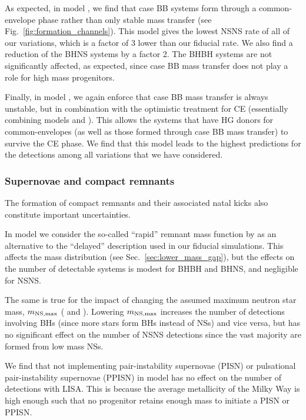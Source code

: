As expected, in model \modCaseBB{}, we find that case BB systems form through a common-envelope phase rather than only stable mass transfer (see Fig.~\ref{fig:formation_channels}). This model gives the lowest NSNS rate of all of our variations, which is a factor of 3 lower than our fiducial rate. We also find a reduction of the BHNS systems by a factor 2. The BHBH systems are not significantly affected, as expected, since case BB mass transfer does not play a role for high mass progenitors.

Finally, in model \modCaseBBOpt{}, we again enforce that case BB mass transfer is always unstable, but in combination with the optimistic treatment for CE (essentially combining models \modCaseBB{} and \modOpt{}). This allows the systems that have HG donors for common-envelopes (as well as those formed through case BB mass transfer) to survive the CE phase. We find that this model leads to the highest predictions for the detections among all variations that we have considered.

\subsubsection{Supernovae and compact remnants}

The formation of compact remnants and their associated natal kicks also constitute important uncertainties.  

In model \modRapid{} we consider the so-called ``rapid'' remnant mass function by \citet{Fryer+2015} as an alternative to the ``delayed'' description used in our fiducial simulations. This affects the mass distribution (see Sec.~\ref{sec:lower_mass_gap}), but the effects on the number of detectable systems is modest for BHBH and BHNS, and negligible for NSNS.  

The same is true for the impact of changing the assumed maximum neutron star mass, $m_{\rm NS, max}$ (\modNSLow{} and \modNSHigh{}). Lowering $m_{\rm NS, max}$ increases the number of detections involving BHs (since more stars form BHs instead of NSs) and vice versa, but has no significant effect on the number of NSNS detections since the vast majority are formed from low mass NSs.

We find that not implementing pair-instability supernovae (PISN) or pulsational pair-instability supernovae (PPISN) in model \modNoPISN{} has no effect on the number of detections with LISA. This is because the average metallicity of the Milky Way is high enough such that no progenitor retains enough mass to initiate a PISN or PPISN.

